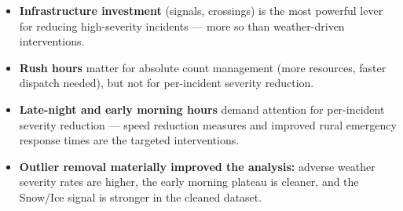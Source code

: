 \begin{itemize}[noitemsep]
  \item \textbf{Infrastructure investment} (signals, crossings) is the most
        powerful lever for reducing high-severity incidents --- more so than
        weather-driven interventions.
  \item \textbf{Rush hours} matter for absolute count management (more
        resources, faster dispatch needed), but not for per-incident severity
        reduction.
  \item \textbf{Late-night and early morning hours} demand attention for
        per-incident severity reduction --- speed reduction measures and improved
        rural emergency response times are the targeted interventions.
  \item \textbf{Outlier removal materially improved the analysis:} adverse
        weather severity rates are higher, the early morning plateau is cleaner,
        and the Snow/Ice signal is stronger in the cleaned dataset.
\end{itemize}
